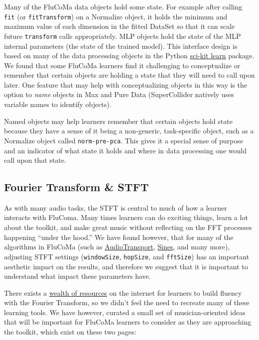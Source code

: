 \documentclass{article}
\begin{document}
Many of the FluCoMa data objects hold some state. For example after
calling \texttt{fit} (or \texttt{fitTransform}) on a Normalize object,
it holds the minimum and maximum value of each dimension in the fitted
DataSet so that it can scale future \texttt{transform} calls
appropriately. MLP objects hold the state of the MLP internal parameters
(the state of the trained model). This interface design is based on many
of the data processing objects in the Python
\href{https://scikit-learn.org/stable/}{sci-kit learn} package. We found
that some FluCoMa learners find it challenging to conceptualize or
remember that certain objects are holding a state that they will need to
call upon later. One feature that may help with conceptualizing objects
in this way is the option to \emph{name} objects in Max and Pure Data
(SuperCollider natively uses variable names to identify objects).

Named objects may help learners remember that certain objects hold state
because they have a sense of it being a non-generic, task-specific
object, such as a Normalize object called \texttt{norm-pre-pca}. This gives
it a special sense of purpose and an indicator of what state it holds
and where in data processing one would call upon that state.

\subsection{Fourier Transform \& STFT}\label{fourier-transform-stft}

As with many audio tasks, the STFT is central to much of how a learner
interacts with FluComa. Many times learners can do exciting things,
learn a lot about the toolkit, and make great music without reflecting
on the FFT processes happening ``under the hood.'' We have found
however, that for many of the algorithms in FluCoMa (such as
\href{https://learn.flucoma.org/reference/audiotransport/}{AudioTransport},
\href{https://learn.flucoma.org/reference/sines/}{Sines}, and many
more), adjusting STFT settings (\texttt{windowSize}, \texttt{hopSize},
and \texttt{fftSize}) has an important aesthetic impact on the results,
and therefore we suggest that it is important to understand what impact
these parameters have.

There exists a
\href{https://learn.flucoma.org/learn/fourier-transform/#related-resources}{wealth
of resources} on the internet for learners to build fluency with the
Fourier Transform, so we didn't feel the need to recreate many of these
learning tools. We have however, curated a small set of musician-oriented ideas that will be important for FluCoMa learners to consider as they are approaching the
toolkit, which exist on these two pages:
\end{document}
